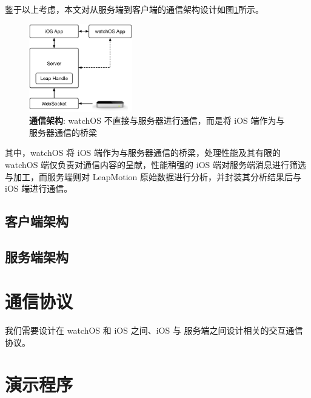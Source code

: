 鉴于以上考虑，本文对从服务端到客户端的通信架构设计如图\ref{fig:im-arch}所示。

\begin{figure}[t]
    \centering
    \includegraphics[width=0.4\textwidth]{figures/arch}
    \caption{\kaishu \textbf{通信架构}: watchOS 不直接与服务器进行通信，而是将 iOS 端作为与服务器通信的桥梁}
    \label{fig:im-arch}
\end{figure}

其中，watchOS 将 iOS 端作为与服务器通信的桥梁，处理性能及其有限的 watchOS 端仅负责对通信内容的呈献，性能稍强的 iOS 端对服务端消息进行筛选与加工，而服务端则对 LeapMotion 原始数据进行分析，并封装其分析结果后与 iOS 端进行通信。

\subsection{客户端架构}

\subsection{服务端架构}

\section{通信协议}

我们需要设计在 watchOS 和 iOS 之间、iOS 与 服务端之间设计相关的交互通信协议。

\section{演示程序}
